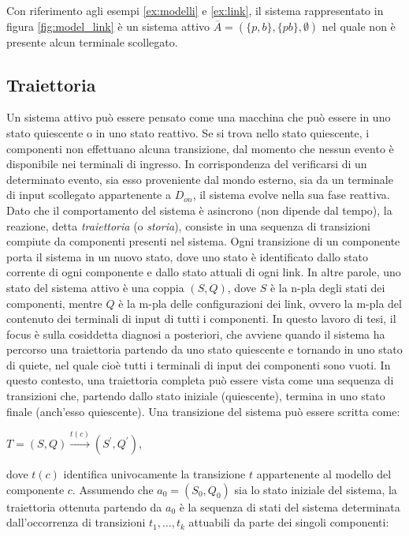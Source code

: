 \begin{ex} \label{ex:sa}
Con riferimento agli esempi \ref{ex:modelli} e \ref{ex:link}, il sistema rappresentato in figura \ref{fig:model_link} è un sistema attivo $\overline A = (\{p,b\},\{pb\},\emptyset)$ nel quale non è presente alcun terminale scollegato.
\end{ex}

\subsection{Traiettoria}
Un sistema attivo può essere pensato come una macchina che può essere in uno stato quiescente o in uno stato reattivo. Se si trova nello stato quiescente, i componenti non effettuano alcuna transizione, dal momento che nessun evento è disponibile nei terminali di ingresso. In corrispondenza del verificarsi di un determinato evento, sia esso proveniente dal mondo esterno, sia da un terminale di input scollegato appartenente a $D_{on}$, il sistema evolve nella sua fase reattiva. Dato che il comportamento del sistema è asincrono (non dipende dal tempo), la reazione, detta \emph{traiettoria} (o \emph{storia}), consiste in una sequenza di transizioni compiute da componenti presenti nel sistema.
Ogni transizione di un componente porta il sistema in un nuovo stato, dove uno stato è identificato dallo stato corrente di ogni componente e dallo stato attuali di ogni link. In altre parole, uno stato del sistema attivo è una coppia $(S,Q)$, dove $S$ è la n-pla degli stati dei componenti, mentre $Q$ è la m-pla delle configurazioni dei link, ovvero la m-pla del contenuto dei terminali di input di tutti i componenti.
In questo lavoro di tesi, il focus è sulla cosiddetta diagnosi a posteriori, che avviene quando il sistema ha percorso una traiettoria partendo da uno stato quiescente e tornando in uno stato di quiete, nel quale cioè tutti i terminali di input dei componenti sono vuoti. In questo contesto, una traiettoria completa può essere vista come una sequenza di transizioni che, partendo dallo stato iniziale (quiescente), termina in uno stato finale (anch'esso quiescente).
Una transizione del sistema può essere scritta come:
\begin{center}
	$T = (S,Q) \xrightarrow {t(c)} (S^\prime,Q^\prime)$,
\end{center}
dove $t(c)$ identifica univocamente la transizione $t$ appartenente al modello del componente $c$.
Assumendo che $a_0 = (S_0,Q_0)$ sia lo stato iniziale del sistema, la traiettoria ottenuta partendo da $a_0$ è la sequenza di stati del sistema determinata dall'occorrenza di transizioni $t_1, \ldots , t_k$ attuabili da parte dei singoli componenti:
